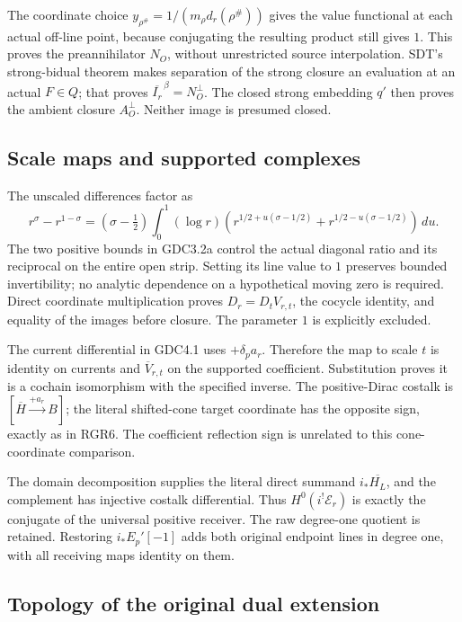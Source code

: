 The coordinate choice \(y_{\rho^\#}=1/(m_\rho d_r(\rho^\#))\) gives the
value functional at each actual off-line point, because conjugating the
resulting product still gives \(1\). This proves the preannihilator
\(N_O\), without unrestricted source interpolation. SDT's strong-bidual
theorem makes separation of the strong closure an evaluation at an
actual \(F\in Q\); that proves \(\overline{I_r}^{\,\beta}=N_O^\perp\).
The closed strong embedding \(q'\) then proves the ambient closure
\(A_O^\perp\). Neither image is presumed closed.

\subsection{Scale maps and supported
complexes}\label{scale-maps-and-supported-complexes}

The unscaled differences factor as \[
r^\sigma-r^{1-\sigma}
 =(\sigma-\tfrac12)\int_0^1(\log r)
\left(r^{1/2+u(\sigma-1/2)}+r^{1/2-u(\sigma-1/2)}\right)\,du.
\] The two positive bounds in GDC3.2a control the actual diagonal ratio
and its reciprocal on the entire open strip. Setting its line value to
\(1\) preserves bounded invertibility; no analytic dependence on a
hypothetical moving zero is required. Direct coordinate multiplication
proves \(D_r=D_tV_{r,t}\), the cocycle identity, and equality of the
images before closure. The parameter \(1\) is explicitly excluded.

The current differential in GDC4.1 uses \(+\delta_pa_r\). Therefore the
map to scale \(t\) is identity on currents and \(\overline V_{r,t}\) on
the supported coefficient. Substitution proves it is a cochain
isomorphism with the specified inverse. The positive-Dirac costalk is
\([\overline H\xrightarrow{+a_r}B]\); the literal shifted-cone target
coordinate has the opposite sign, exactly as in RGR6. The coefficient
reflection sign is unrelated to this cone-coordinate comparison.

The domain decomposition supplies the literal direct summand
\(i_*\overline{H_L}\), and the complement has injective costalk
differential. Thus \(H^0(i^!\mathscr E_r)\) is exactly the conjugate of
the universal positive receiver. The raw degree-one quotient is
retained. Restoring \(i_*E_p'[-1]\) adds both original endpoint lines in
degree one, with all receiving maps identity on them.

\subsection{Topology of the original dual
extension}\label{topology-of-the-original-dual-extension}

